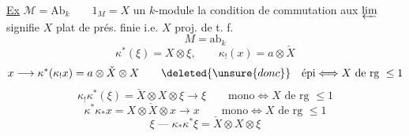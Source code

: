 \uline{Ex} $\mathcal M=\mathrm{Ab}_k\qquad1_M=X$ un $k$-module
la condition de commutation  aux $\varprojlim$
signifie
$X$ plat de prés. finie i.e. $X$ proj. de t. f.
\[
M=\mathrm{ab}_k
\]
\[
\kappa^*(\xi)=X\otimes\xi,\qquad\kappa_!(x)=a\otimes\check X
\]
\[
x\longrightarrow\kappa^*(\kappa_!x)=a\otimes\check X\otimes X
\qquad\deleted{\unsure{donc}}\quad\text{épi}\Longleftrightarrow X\text{ de rg }\leq1
\]
\[
\kappa_!\kappa^*(\xi)=\check X\otimes X\otimes\xi\longrightarrow\xi
\qquad\text{mono}\Longleftrightarrow X\text{ de rg }\leq1
\]
\[
\kappa^*\kappa_*x=X\otimes\check X\otimes x\longrightarrow x
\qquad\text{mono}\Longleftrightarrow X\text{ de rg }\leq1
\]
\[
\xi\mathbin{\text{---}}\kappa_*\kappa^*\xi=\check X\otimes X\otimes\xi
\]
